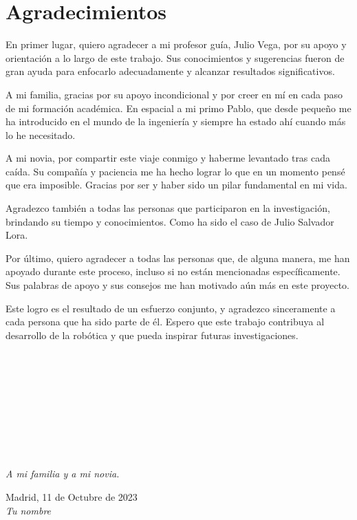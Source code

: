 \cleardoublepage

\chapter*{Agradecimientos}

\noindent En primer lugar, quiero agradecer a mi profesor guía, Julio Vega, por su apoyo y orientación a lo largo de este trabajo. Sus conocimientos y 
sugerencias fueron de gran ayuda para enfocarlo adecuadamente y alcanzar resultados significativos.

A mi familia, gracias por su apoyo incondicional y por creer en mí en cada paso de mi formación académica. En espacial a mi primo Pablo, que desde 
pequeño me ha introducido en el mundo de la ingeniería y siempre ha estado ahí cuando más lo he necesitado.

A mi novia, por compartir este viaje conmigo y haberme levantado tras cada caída. Su compañía y paciencia me ha hecho lograr lo que en un momento pensé 
que era imposible. Gracias por ser y haber sido un pilar fundamental en mi vida.

Agradezco también a todas las personas que participaron en la investigación, brindando su tiempo y conocimientos. Como ha sido el caso de Julio Salvador 
Lora.

Por último, quiero agradecer a todas las personas que, de alguna manera, me han apoyado durante este proceso, incluso si no están mencionadas 
específicamente. Sus palabras de apoyo y sus consejos me han motivado aún más en este proyecto.

Este logro es el resultado de un esfuerzo conjunto, y agradezco sinceramente a cada persona que ha sido parte de él. Espero que este 
trabajo contribuya al desarrollo de la robótica y que pueda inspirar futuras investigaciones.

\ %

\

\

\

\

\begin{flushright}
		\vspace{4.0 cm}
		\emph{A mi familia y a mi novia.}\\
		\par
		\vspace{1.0 cm}
		Madrid, 11 de Octubre de 2023\\ %
		\emph{Tu nombre}
\end{flushright}

\thispagestyle{empty}

